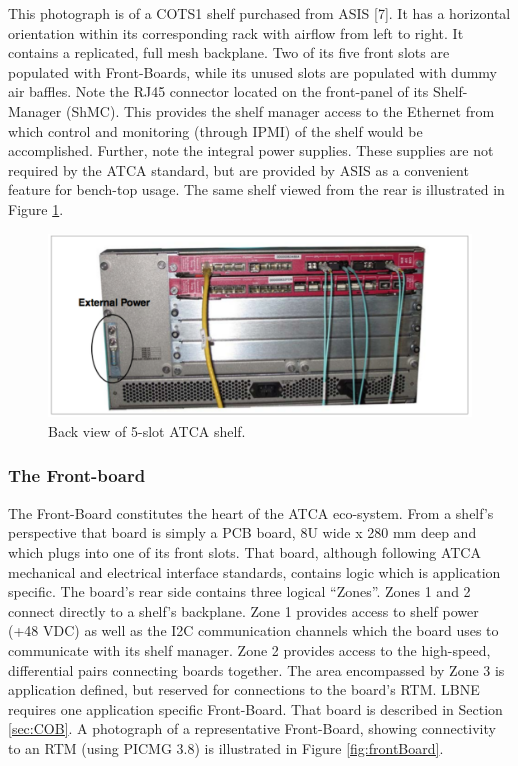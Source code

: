 This photograph is of a COTS1 shelf purchased from ASIS [7]. It has a horizontal orientation within its corresponding rack with airflow from left to right. It contains a replicated, full mesh backplane. Two of its five front slots are populated with Front-Boards, while its unused slots are populated with dummy air baffles. Note the RJ45 connector located on the front-panel of its Shelf-Manager (ShMC). This provides the shelf manager access to the Ethernet from which control and monitoring (through IPMI) of the shelf would be accomplished. Further, note the integral power supplies. These supplies are not required by the ATCA standard, but are provided by ASIS as a convenient feature for bench-top usage. The same shelf viewed from the rear is illustrated in Figure \ref{fig:backShelf}.

\begin{figure}[tbh]
\includegraphics[scale=0.8]{shelf-back.pdf}
\caption{Back view of 5-slot ATCA shelf.}
\label{fig:backShelf}
\end{figure} 


\subsubsection{The Front-board}
\label{sec:frontboard}
The Front-Board constitutes the heart of the ATCA eco-system. From a shelf's perspective that board is simply a PCB board, 8U wide x 280 mm deep and which plugs into one of its front slots. That board, although following ATCA mechanical and electrical interface standards, contains logic which is application specific.  The board's rear side contains three logical “Zones”. Zones 1 and 2 connect directly to a shelf's backplane. Zone 1 provides access to shelf power (+48 VDC) as well as the I2C communication channels which the board uses to communicate with its shelf manager. Zone 2 provides access to the high-speed, differential pairs connecting boards together. The area encompassed by Zone 3 is application defined, but reserved for connections to the board's RTM.
LBNE requires one application specific Front-Board. That board is described in Section \ref{sec:COB}.
A photograph of a representative Front-Board, showing connectivity to an RTM (using PICMG 3.8) is illustrated in Figure \ref{fig:frontBoard}.

